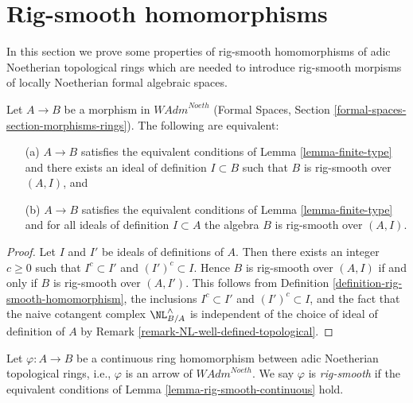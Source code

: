 












\section{Rig-smooth homomorphisms}
\label{section-rig-smooth-homomorphisms}

\noindent
In this section we prove some properties of
rig-smooth homomorphisms of adic Noetherian
topological rings which are needed to introduce
rig-smooth morpisms of locally Noetherian
formal algebraic spaces.

\begin{lemma}
\label{lemma-rig-smooth-continuous}
Let $A \to B$ be a morphism in $\textit{WAdm}^{Noeth}$
(Formal Spaces, Section \ref{formal-spaces-section-morphisms-rings}).
The following are equivalent:
\begin{enumerate}
\item[(a)] $A \to B$ satisfies the equivalent conditions of
Lemma \ref{lemma-finite-type} and there exists an ideal of definition
$I \subset B$ such that $B$ is rig-smooth over $(A, I)$, and
\item[(b)] $A \to B$ satisfies the equivalent conditions of
Lemma \ref{lemma-finite-type} and for all ideals of definition
$I \subset A$ the algebra $B$ is rig-smooth over $(A, I)$.
\end{enumerate}
\end{lemma}

\begin{proof}
Let $I$ and $I'$ be ideals of definitions of $A$. Then there exists an
integer $c \geq 0$ such that $I^c \subset I'$ and $(I')^c \subset I$. Hence
$B$ is rig-smooth over $(A, I)$ if and only if
$B$ is rig-smooth over $(A, I')$. This follows from
Definition \ref{definition-rig-smooth-homomorphism},
the inclusions $I^c \subset I'$ and $(I')^c \subset I$, and
the fact that the naive cotangent complex $\NL_{B/A}^\wedge$
is independent of the choice of ideal of definition of $A$ by
Remark \ref{remark-NL-well-defined-topological}.
\end{proof}

\begin{definition}
\label{definition-rig-smooth-continuous-homomorphism}
Let $\varphi : A \to B$ be a continuous ring homomorphism
between adic Noetherian topological rings, i.e., $\varphi$
is an arrow of $\textit{WAdm}^{Noeth}$. We say
$\varphi$ is {\it rig-smooth} if the equivalent conditions
of Lemma \ref{lemma-rig-smooth-continuous} hold.
\end{definition}

